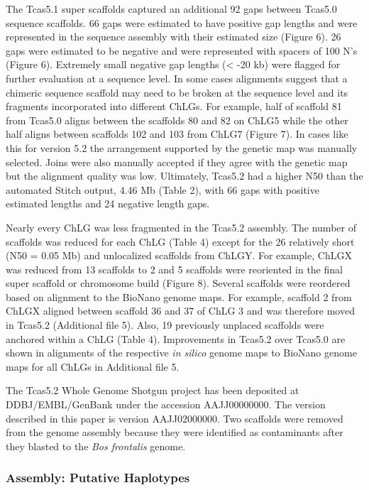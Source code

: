 \documentclass{bmcart}
\begin{document}
The Tcas5.1 super scaffolds captured an additional 92 gaps between Tcas5.0 sequence scaffolds. 66 gaps were estimated to have positive gap lengths and were represented in the sequence assembly with their estimated size (Figure 6). 26 gaps were estimated to be negative and were represented with spacers of 100 N's (Figure 6). Extremely small negative gap lengths (< -20 kb) were flagged for further evaluation at a sequence level. In some cases alignments suggest that a chimeric sequence scaffold may need to be broken at the sequence level and its fragments incorporated into different ChLGs. For example, half of scaffold 81 from Tcas5.0 aligns between the scaffolds 80 and 82 on ChLG5 while the other half aligns between scaffolds 102 and 103 from ChLG7 (Figure 7). In cases like this for version 5.2 the arrangement supported by the genetic map was manually selected. Joins were also manually accepted if they agree with the genetic map but the alignment quality was low. Ultimately, Tcas5.2 had a higher N50 than the automated Stitch output, 4.46 Mb (Table 2), with 66 gaps with positive estimated lengths and 24 negative length gaps. 

Nearly every ChLG was less fragmented in the Tcas5.2 assembly. The number of scaffolds was reduced for each ChLG (Table 4) except for the 26 relatively short (N50 = 0.05 Mb) and unlocalized scaffolds from ChLGY. For example, ChLGX was reduced from 13 scaffolds to 2 and 5 scaffolds were reoriented in the final super scaffold or chromosome build (Figure 8). Several scaffolds were reordered based on alignment to the BioNano genome maps. For example, scaffold 2 from ChLGX aligned between scaffold 36 and 37 of ChLG 3 and was therefore moved in Tcas5.2 (Additional file 5). Also, 19 previously unplaced scaffolds were anchored within a ChLG (Table 4). Improvements in Tcas5.2 over Tcas5.0 are shown in alignments of the respective \textit{in silico} genome maps to BioNano genome maps  for all ChLGs in Additional file 5.

The Tcas5.2 Whole Genome Shotgun project has been deposited at DDBJ/EMBL/GenBank under the accession AAJJ00000000. The version described in this paper is version AAJJ02000000. Two scaffolds were removed from the genome assembly because they were identified as contaminants after they blasted to the \textit{Bos frontalis} genome.

\subsubsection*{Assembly: Putative Haplotypes}
\end{document}
